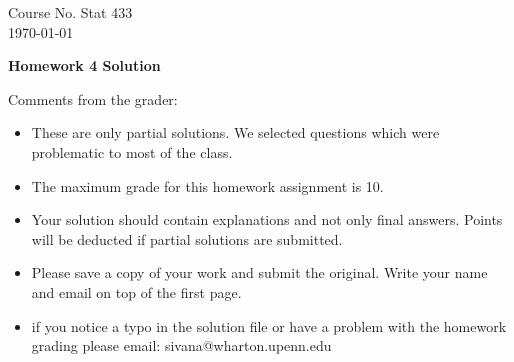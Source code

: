 \documentclass[10pt,a4paper]{article}
\begin{document}
\begin{flushleft}
Course No. Stat 433 \\
\today
\end{flushleft}

\begin{center}
{\Large{\bf  Homework 4 Solution}}
\end{center}

\textcolor[rgb]{0.98,0.00,0.00}{Comments from the grader:}
\begin{itemize}

    \item \textcolor[rgb]{0.98,0.00,0.00}{These are only partial solutions.  We selected
    questions which were problematic to most of the class.}
    \item \textcolor[rgb]{0.98,0.00,0.00}{The maximum grade for this homework assignment is 10.}
    \item \textcolor[rgb]{0.98,0.00,0.00}{Your solution should contain explanations and not only
    final answers. Points will be deducted if partial solutions
    are submitted.}
    \item \textcolor[rgb]{0.98,0.00,0.00}{Please save a copy of your work and submit the original.
    Write your name and email on top of the first page.}
    \item \textcolor[rgb]{0.98,0.00,0.00}{if you notice a typo in the solution file or have a problem with the homework
    grading please email: sivana@wharton.upenn.edu
}
\end{itemize}
\end{document}
